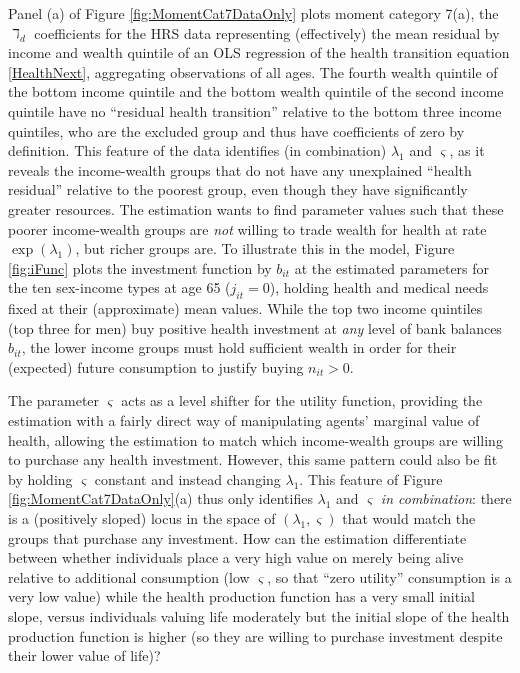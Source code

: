 \documentclass[12pt,pdftex,letterpaper]{article}
\newcommand{\Invst}{n}
\newcommand{\Bank}{b}
\newcommand{\LifeUtility}{\varsigma}
\newcommand{\Age}{j}
\newcommand{\HealthProdParamAlt}{\lambda}
\begin{document}
Panel (a) of Figure \ref{fig:MomentCat7DataOnly} plots moment category 7(a), the $\daleth_d$ coefficients for the HRS data representing (effectively) the mean residual by income and wealth quintile of an OLS regression of the health transition equation \eqref{HealthNext}, aggregating observations of all ages.  The fourth wealth quintile of the bottom income quintile and the bottom wealth quintile of the second income quintile have no ``residual health transition'' relative to the bottom three income quintiles, who are the excluded group and thus have coefficients of zero by definition.  This feature of the data identifies (in combination) $\HealthProdParamAlt_1$ and $\LifeUtility$, as it reveals the income-wealth groups that do not have any unexplained ``health residual'' relative to the poorest group, even though they have significantly greater resources.  The estimation wants to find parameter values such that these poorer income-wealth groups are \textit{not} willing to trade wealth for health at rate $\exp(\HealthProdParamAlt_1)$, but richer groups are.  To illustrate this in the model, Figure \ref{fig:iFunc} plots the investment function by $\Bank_{it}$ at the estimated parameters for the ten sex-income types at age 65 ($\Age_{it}=0$), holding health and medical needs fixed at their (approximate) mean values.  While the top two income quintiles (top three for men) buy positive health investment at \textit{any} level of bank balances $\Bank_{it}$, the lower income groups must hold sufficient wealth in order for their (expected) future consumption to justify buying $\Invst_{it} > 0$.

The parameter $\LifeUtility$ acts as a level shifter for the utility function, providing the estimation with a fairly direct way of manipulating agents' marginal value of health, allowing the estimation to match which income-wealth groups are willing to purchase any health investment.  However, this same pattern could also be fit by holding $\LifeUtility$ constant and instead changing $\HealthProdParamAlt_1$.  This feature of Figure \ref{fig:MomentCat7DataOnly}(a) thus only identifies $\HealthProdParamAlt_1$ and $\LifeUtility$ \textit{in combination}: there is a (positively sloped) locus in the space of $(\HealthProdParamAlt_1,\LifeUtility)$ that would match the groups that purchase any investment.  How can the estimation differentiate between whether individuals place a very high value on merely being alive relative to additional consumption (low $\LifeUtility$, so that ``zero utility'' consumption is a very low value) while the health production function has a very small initial slope, versus individuals valuing life moderately but the initial slope of the health production function is higher (so they are willing to purchase investment despite their lower value of life)?
\end{document}
